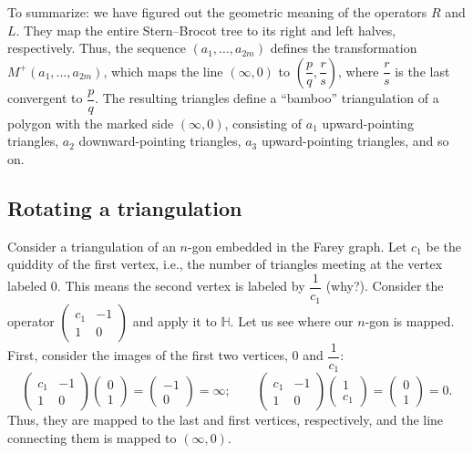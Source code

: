 \documentclass[a4paper,11pt]{amsart}
\newcommand{\HH}{{\mathbb{H}}}
\theoremstyle{plain}
\theoremstyle{remark}
\theoremstyle{definition}
\numberwithin{equation}{section}
\numberwithin{figure}{section}
\begin{document}
To summarize: we have figured out the geometric meaning of the operators $R$ and $L$. They map the entire Stern--Brocot tree to its right and left halves, respectively. Thus, the sequence $(a_1,\dots,a_{2m})$ defines the transformation $M^+(a_1,\dots,a_{2m})$, which maps the line $(\infty, 0)$ to $\left(\dfrac{p}{q}, \dfrac{r}{s}\right)$, where $\dfrac rs$ is the last convergent to $\dfrac{p}{q}$. The resulting triangles define a ``bamboo'' triangulation of a polygon with the marked side $(\infty,0)$, consisting of $a_1$ upward-pointing triangles, $a_2$ downward-pointing triangles, $a_3$ upward-pointing triangles, and so on.

\subsection{Rotating a triangulation}

Consider a triangulation of an $n$-gon embedded in the Farey graph. Let $c_1$ be the quiddity of the first vertex, i.e., the number of triangles meeting at the vertex labeled $0$. This means the second vertex is labeled by $\dfrac 1{c_1}$ (why?). Consider the operator $\begin{pmatrix} c_1 & -1\\1 &0\end{pmatrix}$ and apply it to $\HH$. Let us see where our $n$-gon is mapped. First, consider the images of the first two vertices, $0$ and $\dfrac 1{c_1}$:
\[
\begin{pmatrix} c_1 & -1\\1 &0\end{pmatrix}\begin{pmatrix}0\\ 1\end{pmatrix}= \begin{pmatrix}-1\\ 0\end{pmatrix}=\infty;\qquad 
\begin{pmatrix} c_1 & -1\\1 &0\end{pmatrix}\begin{pmatrix}1\\ c_1\end{pmatrix}= \begin{pmatrix}0\\ 1\end{pmatrix}=0.
\]
Thus, they are mapped to the last and first vertices, respectively, and the line connecting them is mapped to $(\infty,0)$.
\end{document}
